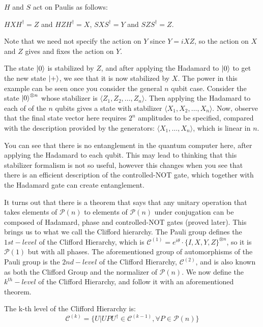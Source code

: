 \documentclass[12pt]{dalthesis}
\begin{document}
\begin{proposition}
$H$ and $S$ act on Paulis as follows:
\begin{center}
$HXH^{\dag} = Z$ and $HZH^{\dag} = X$, $SXS^{\dag} = Y$ and $SZS^{\dag} = Z$.
\end{center}
Note that we need not specify the action on $Y$ since $Y = iXZ$, so the action on $X$ and $Z$ gives and fixes the action on $Y$.
\end{proposition}


The state $\ket{0}$ is stabilized by $Z$, and after applying the Hadamard to $\ket{0}$ to get the new state $\ket{+}$, we see that it is now stabilized by $X$. The power in this example can be seen once you consider the general $n$ qubit case. Consider the state $\ket{0}^{\otimes n}$ whose stabilizer is $\langle Z_1, Z_2, \dots , Z_n \rangle$. Then applying the Hadamard to each of of the $n$ qubits gives a state with stabilizer $\langle X_1 , X_2, \dots , X_n \rangle $. Now, observe that the final state vector here requires $2^n$ amplitudes to be specified, compared with the description provided by the generators: $\langle X_1, \dots , X_n \rangle$, which is linear in $n$. 

You can see that there is no entanglement in the quantum computer here, after applying the Hadamard to each qubit. This may lead to thinking that this stabilizer formalism is not so useful, however this changes when you see that there is an efficient description of the controlled-NOT gate, which together with the Hadamard gate can create entanglement. 

It turns out that there is a theorem that says that any unitary operation that takes elements of $\mathcal{P}(n)$ to elements of $\mathcal{P}(n)$ under conjugation can be composed of Hadamard, phase and controlled-NOT gates (proved later). This brings us to what we call the Clifford hierarchy. The Pauli group defines the $1st-level$ of the Clifford Hierarchy, which is $\mathcal{C}^{(1)} = e^{i\theta} \cdot \{I, X, Y, Z\}^{\otimes n}$, so it is $\mathcal{P}(1)$ but with all phases. The aforementioned group of automorphisms of the Pauli group is the $2nd-level$ of the Clifford Hierarchy, $\mathcal{C}^{(2)}$, and is also known as both the Clifford Group and the normalizer of $\mathcal{P}(n)$. We now define the $k^{th}-level$ of the Clifford Hierarchy, and follow it with an aforementioned theorem.

\begin{definition} The k-th level of the Clifford Hierarchy is:
\label{CliffHierarchy}
\begin{equation}
\mathcal{C}^{(k)} = \{ U | UPU^{\dag} \in \mathcal{C}^{(k-1)}, \forall P \in \mathcal{P}(n) \}
\end{equation}
\end{definition}
\end{document}
